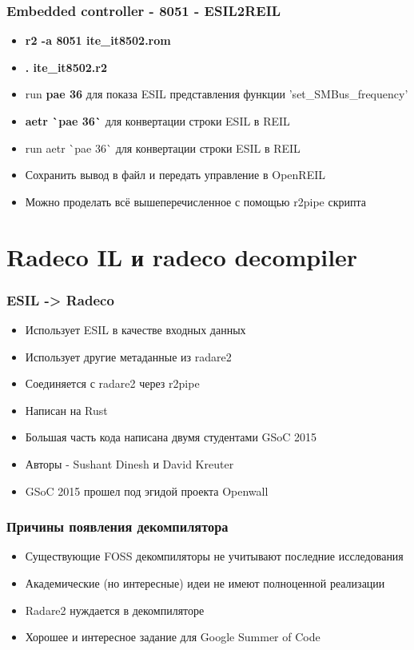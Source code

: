 \documentclass[10pt,pdf,utf8,english,compress,hyperref={unicode}]{beamer}
\begin{document}
\begin{frame}[fragile]
  \frametitle{Embedded controller - 8051 - ESIL2REIL}
  \begin{itemize}
	  \item \alert{\bf{r2 -a 8051 ite\_it8502.rom}}
	  \item \alert{\bf{. ite\_it8502.r2}}
	  \item run \alert{\bf{pae 36}} для показа ESIL представления функции 'set\_SMBus\_frequency'
\ifxetex
	  \item \alert{\bf{aetr \`{}pae 36\`}} для конвертации строки ESIL в REIL
\else
	  \item run aetr \`{}pae 36\`{} для конвертации строки ESIL в REIL
\fi
	  \item Сохранить вывод в файл и передать управление в OpenREIL
	  \item Можно проделать всё вышеперечисленное с помощью r2pipe скрипта
  \end{itemize}
\end{frame}

\section{Radeco IL и radeco decompiler}

\begin{frame}[fragile]
  \frametitle{ESIL -> Radeco }
     \begin{itemize}
        \item Использует ESIL в качестве входных данных
		\item Использует другие метаданные из radare2
		\item Соединяется с radare2 через r2pipe
		\item Написан на Rust
		\item Большая часть кода написана двумя студентами GSoC 2015
		\item Авторы - Sushant Dinesh и David Kreuter 
		\item GSoC 2015 прошел под эгидой проекта Openwall
      \end{itemize}
\end{frame}

\begin{frame}[fragile]
  \frametitle{Причины появления декомпилятора}
     \begin{itemize}
        \item Существующие FOSS декомпиляторы не учитывают последние исследования
		\item Академические (но интересные) идеи не имеют полноценной реализации
		\item Radare2 нуждается в декомпиляторе
		\item Хорошее и интересное задание для Google Summer of Code
      \end{itemize}
\end{frame}
\end{document}
